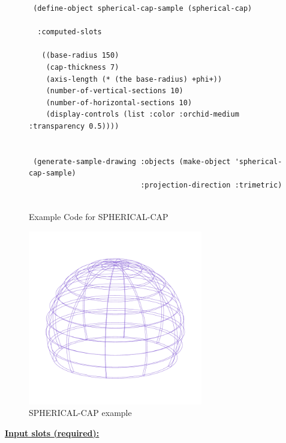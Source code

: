 \documentclass [11pt]{book}
\begin{document}
\begin{itemize}
\begin{figure}
\begin{lrbox}{\boxedverb}
\begin{minipage}{\linewidth}
{\begin{verbatim}
 (define-object spherical-cap-sample (spherical-cap)
   
  :computed-slots

   ((base-radius 150)
    (cap-thickness 7)
    (axis-length (* (the base-radius) +phi+))
    (number-of-vertical-sections 10)
    (number-of-horizontal-sections 10)
    (display-controls (list :color :orchid-medium :transparency 0.5))))
  

 (generate-sample-drawing :objects (make-object 'spherical-cap-sample) 
                          :projection-direction :trimetric)
                  

\end{verbatim}}
\end{minipage}
\end{lrbox}
\fbox{\usebox{\boxedverb}}

\caption{Example Code for SPHERICAL-CAP}

\label{fig:example-code-SPHERICAL-CAP}

\end{figure}

\begin{figure}
\begin{center}
\includegraphics[width=3in,height=3in]{../images/example-SPHERICAL-CAP.pdf}
\end{center}

\caption{SPHERICAL-CAP example}

\label{fig:SPHERICAL-CAP}

\end{figure}





\textbf{
\underline{Input slots (required):}}

\begin{description}


\end{description}
\end{itemize}
\end{document}
